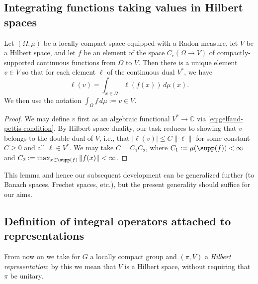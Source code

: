 \documentclass[reqno]{amsart} 
\begin{document}
\subsection{Integrating functions taking values in Hilbert spaces}
\begin{lemma}
  Let $(\Omega,\mu)$ be a locally compact space equipped with a Radon measure, let $V$ be a Hilbert space, and let $f$ be an element of the space $C_c(\Omega \rightarrow V)$ of compactly-supported continuous functions from $\Omega$ to $V$.  Then there is a unique element $v \in V$ so that for each element $\ell$ of the continuous dual $V^*$, we have
  \begin{equation}\label{eq:gelfand-pettis-condition}
    \ell(v) = \int_{x \in \Omega} \ell(f(x)) \, d \mu(x).
  \end{equation}
  We then use the notation $\int_\Omega f \, d \mu := v \in V$.
\end{lemma}
\begin{proof}
  We may define $v$ first as an algebraic functional $V^* \rightarrow \mathbb{C}$ via \eqref{eq:gelfand-pettis-condition}.  By Hilbert space duality, our task reduces to showing that $v$ belongs to the double dual of $V$, i.e., that $|\ell(v)| \leq C \|\ell\|$ for some constant $C \geq 0$ and all $\ell \in V^*$.  We may take $C = C_1 C_2$, where $C_1 := \mu(\supp(f)) < \infty$ and $C_2 := \max_{x \in \supp(f)} \|f(x)\| < \infty$.
\end{proof}

This lemma and hence our subsequent development can be generalized further (to Banach spaces, Frechet spaces, etc.), but the present generality should suffice for our aims.

\subsection{Definition of integral operators
attached to representations}
From now on we take for $G$ a locally compact group and $(\pi,V)$ a \emph{Hilbert representation}; by this we mean that $V$ is a Hilbert space, without requiring that $\pi$ be unitary.
\end{document}
